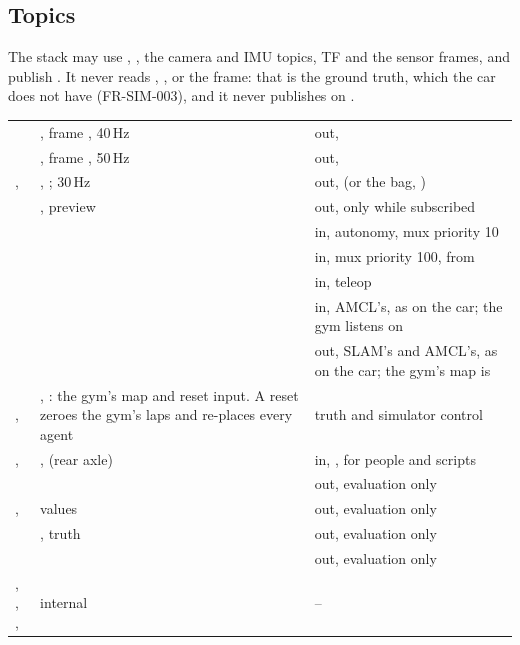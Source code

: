 \documentclass[11pt,a4paper]{article}
\newcommand{\planned}{\target{Planned}}
\begin{document}
\subsection{Topics}
The stack may use , , the camera and IMU topics, TF \arrowto{} and the sensor frames, and publish . It never reads , ,  or the  frame: that is the ground truth, which the car does not have (FR-SIM-003), and it never publishes on .

\begin{tabularx}{\textwidth}{@{}L{4.4cm} L{5.4cm} Y@{}}
\toprule
{} &  &  \\
\midrule
\endhead
{} & , frame , 40\,Hz & out,  \\
 & , frame , 50\,Hz & out,  \\
,  &  , ; 30\,Hz & out,  (or the bag, \planned) \\
\allowbreak{} & , preview & out, only while subscribed \\
 &  & in, autonomy, mux priority 10 \\
 &  & in, mux priority 100, from  \\
 &  & in, teleop \\
 &  & in, AMCL's, as on the car; the gym listens on  \\
 &  & out, SLAM's and AMCL's, as on the car; the gym's map is  \\
,  & , : the gym's map and reset input. A reset zeroes the gym's laps and re-places every agent & truth and simulator control \\
,  & ,  (rear axle) & in, , for people and scripts \\
 &  & out, evaluation only \\
,  &  values & out, evaluation only \\
 & , truth & out, evaluation only \\
 &  & out, evaluation only \\
, , ,  & internal & -- \\
\bottomrule
\end{tabularx}
\end{document}
